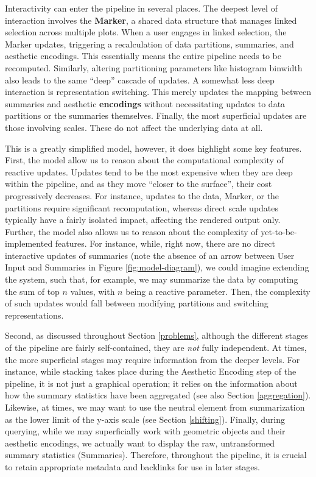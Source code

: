 \documentclass[
  openany]{book}
\theoremstyle{definition}
\theoremstyle{definition}
\theoremstyle{definition}
\theoremstyle{definition}
\theoremstyle{remark}
\begin{document}
Interactivity can enter the pipeline in several places. The deepest level of interaction involves the \textbf{Marker}, a shared data structure that manages linked selection across multiple plots. When a user engages in linked selection, the Marker updates, triggering a recalculation of data partitions, summaries, and aesthetic encodings. This essentially means the entire pipeline needs to be recomputed. Similarly, altering partitioning parameters like histogram binwidth also leads to the same ``deep'' cascade of updates. A somewhat less deep interaction is representation switching. This merely updates the mapping between summaries and aesthetic \textbf{encodings} without necessitating updates to data partitions or the summaries themselves. Finally, the most superficial updates are those involving scales. These do not affect the underlying data at all.

This is a greatly simplified model, however, it does highlight some key features. First, the model allow us to reason about the computational complexity of reactive updates. Updates tend to be the most expensive when they are deep within the pipeline, and as they move ``closer to the surface'', their cost progressively decreases. For instance, updates to the data, Marker, or the partitions require significant recomputation, whereas direct scale updates typically have a fairly isolated impact, affecting the rendered output only. Further, the model also allows us to reason about the complexity of yet-to-be-implemented features. For instance, while, right now, there are no direct interactive updates of summaries (note the absence of an arrow between User Input and Summaries in Figure \ref{fig:model-diagram}), we could imagine extending the system, such that, for example, we may summarize the data by computing the sum of top \(n\) values, with \(n\) being a reactive parameter. Then, the complexity of such updates would fall between modifying partitions and switching representations.

Second, as discussed throughout Section \ref{problems}, although the different stages of the pipeline are fairly self-contained, they are \emph{not} fully independent. At times, the more superficial stages may require information from the deeper levels. For instance, while stacking takes place during the Aesthetic Encoding step of the pipeline, it is not just a graphical operation; it relies on the information about how the summary statistics have been aggregated (see also Section \ref{aggregation}). Likewise, at times, we may want to use the neutral element from summarization as the lower limit of the y-axis scale (see Section \ref{shifting}). Finally, during querying, while we may superficially work with geometric objects and their aesthetic encodings, we actually want to display the raw, untransformed summary statistics (Summaries). Therefore, throughout the pipeline, it is crucial to retain appropriate metadata and backlinks for use in later stages.
\end{document}
